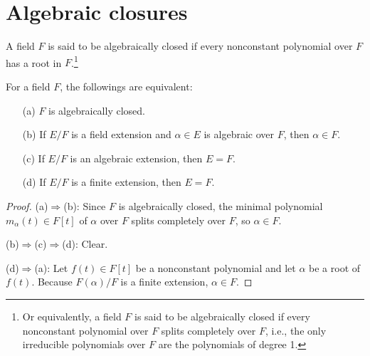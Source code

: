 \section{Algebraic closures}

\begin{defi}
    A field $F$ is said to be algebraically closed if every nonconstant polynomial over $F$ has a root in $F$.\footnote{Or equivalently, a field $F$ is said to be algebraically closed if every nonconstant polynomial over $F$ splits completely over $F$, i.e., the only irreducible polynomials over $F$ are the polynomials of degree 1.}
\end{defi}
\begin{obs}\label{obs: alg. cl.}
    For a field $F$, the followings are equivalent:
    \begin{enumerate}
        \item[(a)]
        {
            $F$ is algebraically closed.
        }
        \item[(b)]
        {
            If $E/F$ is a field extension and $\alpha\in E$ is algebraic over $F$, then $\alpha\in F$.
        }
        \item[(c)]
        {
            If $E/F$ is an algebraic extension, then $E=F$.
        }
        \item[(d)]
        {
            If $E/F$ is a finite extension, then $E=F$.
        }
    \end{enumerate}
\end{obs}
\begin{proof}
    \hangindent=0.65cm
    \noindent(a)$\Rightarrow$(b):
    Since $F$ is algebraically closed, the minimal polynomial $m_\alpha(t)\in F[t]$ of $\alpha$ over $F$ splits completely over $F$, so $\alpha\in F$.

    \noindent(b)$\Rightarrow$(c)$\Rightarrow$(d):
    Clear.

    \noindent(d)$\Rightarrow$(a):
    Let $f(t)\in F[t]$ be a nonconstant polynomial and let $\alpha$ be a root of $f(t)$.
    Because $F(\alpha)/F$ is a finite extension, $\alpha\in F$.
\end{proof}

